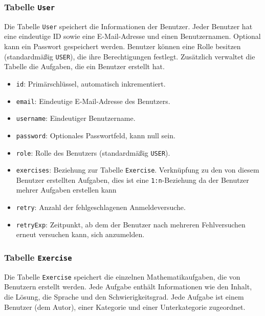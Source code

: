 \subsubsection{Tabelle \texttt{User}}

Die Tabelle \texttt{User} speichert die Informationen der Benutzer. Jeder Benutzer hat eine eindeutige ID sowie eine E-Mail-Adresse und einen Benutzernamen. Optional kann ein Passwort gespeichert werden. Benutzer können eine Rolle besitzen (standardmäßig \texttt{USER}), die ihre Berechtigungen festlegt. Zusätzlich verwaltet die Tabelle die Aufgaben, die ein Benutzer erstellt hat.

\begin{itemize}
  \item \texttt{id}: Primärschlüssel, automatisch inkrementiert.
  \item \texttt{email}: Eindeutige E-Mail-Adresse des Benutzers.
  \item \texttt{username}: Eindeutiger Benutzername.
  \item \texttt{password}: Optionales Passwortfeld, kann null sein.
  \item \texttt{role}: Rolle des Benutzers (standardmäßig \texttt{USER}).
  \item \texttt{exercises}: Beziehung zur Tabelle \texttt{Exercise}. Verknüpfung zu den von diesem Benutzer erstellten Aufgaben, dies ist eine \texttt{1:n}-Beziehung da der Benutzer mehrer Aufgaben erstellen kann
  \item \texttt{retry}: Anzahl der fehlgeschlagenen Anmeldeversuche.
  \item \texttt{retryExp}: Zeitpunkt, ab dem der Benutzer nach mehreren Fehlversuchen erneut versuchen kann, sich anzumelden.
\end{itemize}

\subsubsection{Tabelle \texttt{Exercise}}

Die Tabelle \texttt{Exercise} speichert die einzelnen Mathematikaufgaben, die von Benutzern erstellt werden. Jede Aufgabe enthält Informationen wie den Inhalt, die Lösung, die Sprache und den Schwierigkeitsgrad. Jede Aufgabe ist einem Benutzer (dem Autor), einer Kategorie und einer Unterkategorie zugeordnet.

